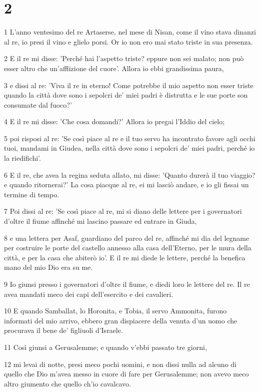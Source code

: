 \chapter{2}

\par 1 L'anno ventesimo del re Artaserse, nel mese di Nisan, come il vino stava dinanzi al re, io presi il vino e glielo porsi. Or io non ero mai stato triste in sua presenza.
\par 2 E il re mi disse: 'Perché hai l'aspetto triste? eppure non sei malato; non può esser altro che un'afflizione del cuore'. Allora io ebbi grandissima paura,
\par 3 e dissi al re: 'Viva il re in eterno! Come potrebbe il mio aspetto non esser triste quando la città dove sono i sepolcri de' miei padri è distrutta e le sue porte son consumate dal fuoco?'
\par 4 E il re mi disse: 'Che cosa domandi?' Allora io pregai l'Iddio del cielo;
\par 5 poi risposi al re: 'Se così piace al re e il tuo servo ha incontrato favore agli occhi tuoi, mandami in Giudea, nella città dove sono i sepolcri de' miei padri, perché io la riedifichi'.
\par 6 E il re, che avea la regina seduta allato, mi disse: 'Quanto durerà il tuo viaggio? e quando ritornerai?' La cosa piacque al re, ei mi lasciò andare, e io gli fissai un termine di tempo.
\par 7 Poi dissi al re: 'Se così piace al re, mi si diano delle lettere per i governatori d'oltre il fiume affinché mi lascino passare ed entrare in Giuda,
\par 8 e una lettera per Asaf, guardiano del parco del re, affinché mi dia del legname per costruire le porte del castello annesso alla casa dell'Eterno, per le mura della città, e per la casa che abiterò io'. E il re mi diede le lettere, perché la benefica mano del mio Dio era su me.
\par 9 Io giunsi presso i governatori d'oltre il fiume, e diedi loro le lettere del re. Il re avea mandati meco dei capi dell'esercito e dei cavalieri.
\par 10 E quando Samballat, lo Horonita, e Tobia, il servo Ammonita, furono informati del mio arrivo, ebbero gran dispiacere della venuta d'un uomo che procurava il bene de' figliuoli d'Israele.
\par 11 Così giunsi a Gerusalemme; e quando v'ebbi passato tre giorni,
\par 12 mi levai di notte, presi meco pochi uomini, e non dissi nulla ad alcuno di quello che Dio m'avea messo in cuore di fare per Gerusalemme; non avevo meco altro giumento che quello ch'io cavalcavo.
